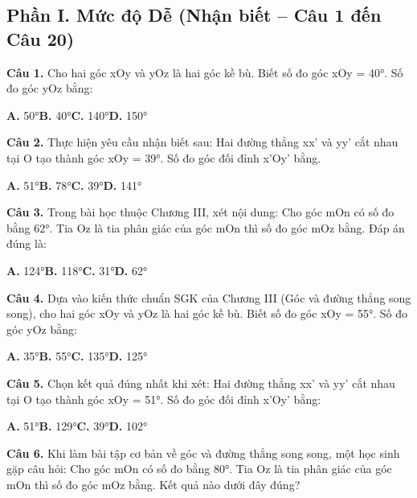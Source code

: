 \documentclass[11pt,a4paper]{article}
\begin{document}
\subsection*{\color{accent} Phần I. Mức độ Dễ (Nhận biết -- Câu 1 đến Câu 20)}
\textbf{\color{primary} Câu 1.} Cho hai góc xOy và yOz là hai góc kề bù. Biết số đo góc xOy = 40°. Số đo góc yOz bằng:\par
\hspace*{1.5em}\textbf{A.} 50°\quad\quad \textbf{B.} 40°\quad\quad \textbf{C.} 140°\quad\quad \textbf{D.} 150°\par\vspace{2pt}
\textbf{\color{primary} Câu 2.} Thực hiện yêu cầu nhận biết sau: Hai đường thẳng xx' và yy' cắt nhau tại O tạo thành góc xOy = 39°. Số đo góc đối đỉnh x'Oy' bằng.\par
\hspace*{1.5em}\textbf{A.} 51°\quad\quad \textbf{B.} 78°\quad\quad \textbf{C.} 39°\quad\quad \textbf{D.} 141°\par\vspace{2pt}
\textbf{\color{primary} Câu 3.} Trong bài học thuộc Chương III, xét nội dung: Cho góc mOn có số đo bằng 62°. Tia Oz là tia phân giác của góc mOn thì số đo góc mOz bằng. Đáp án đúng là:\par
\hspace*{1.5em}\textbf{A.} 124°\quad\quad \textbf{B.} 118°\quad\quad \textbf{C.} 31°\quad\quad \textbf{D.} 62°\par\vspace{2pt}
\textbf{\color{primary} Câu 4.} Dựa vào kiến thức chuẩn SGK của Chương III (Góc và đường thẳng song song), cho hai góc xOy và yOz là hai góc kề bù. Biết số đo góc xOy = 55°. Số đo góc yOz bằng:\par
\hspace*{1.5em}\textbf{A.} 35°\quad\quad \textbf{B.} 55°\quad\quad \textbf{C.} 135°\quad\quad \textbf{D.} 125°\par\vspace{2pt}
\textbf{\color{primary} Câu 5.} Chọn kết quả đúng nhất khi xét: Hai đường thẳng xx' và yy' cắt nhau tại O tạo thành góc xOy = 51°. Số đo góc đối đỉnh x'Oy' bằng:\par
\hspace*{1.5em}\textbf{A.} 51°\quad\quad \textbf{B.} 129°\quad\quad \textbf{C.} 39°\quad\quad \textbf{D.} 102°\par\vspace{2pt}
\textbf{\color{primary} Câu 6.} Khi làm bài tập cơ bản về góc và đường thẳng song song, một học sinh gặp câu hỏi: Cho góc mOn có số đo bằng 80°. Tia Oz là tia phân giác của góc mOn thì số đo góc mOz bằng. Kết quả nào dưới đây đúng?\par
\end{document}
